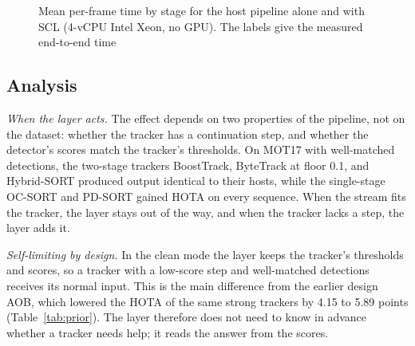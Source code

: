 \documentclass[pdflatex,sn-mathphys-num,iicol]{sn-jnl}
\newcommand{\scl}{SCL}
\newcommand{\aob}{AOB}
\begin{document}
\begin{figure}[t]
\centering
\caption{Mean per-frame time by stage for the host pipeline alone and with
\scl{} (4-vCPU Intel Xeon, no GPU). The labels give the measured
end-to-end time}
\label{fig:runtime}
\end{figure}
\subsection{Analysis}\label{sec:discussion}

\emph{When the layer acts.} The effect depends on two properties of the
pipeline, not on the dataset: whether the tracker has a continuation step,
and whether the detector's scores match the tracker's thresholds. On MOT17
with well-matched detections, the two-stage trackers BoostTrack, ByteTrack at
floor 0.1, and Hybrid-SORT produced output identical to their hosts, while
the single-stage OC-SORT and PD-SORT gained HOTA on every sequence. When the
stream fits the tracker, the layer stays out of the way, and when the
tracker lacks a step, the layer adds it.

\emph{Self-limiting by design.} In the clean mode the layer keeps the
tracker's thresholds and scores, so a tracker with a low-score step and
well-matched detections receives its normal input. This is the main
difference from the earlier design \aob{}, which lowered the HOTA of the same
strong trackers by 4.15 to 5.89 points (Table~\ref{tab:prior}). The layer
therefore does not need to know in advance whether a tracker needs help; it
reads the answer from the scores.
\end{document}
